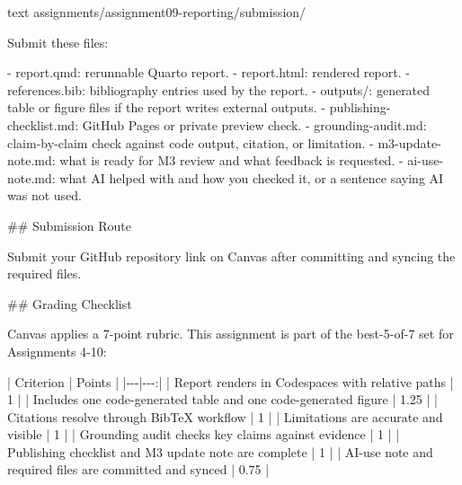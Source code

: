 \documentclass[
  letterpaper,
  DIV=11,
  numbers=noendperiod,
  oneside]{scrreprt}
\newenvironment{Shaded}{\begin{snugshade}}{\end{snugshade}}
\newcommand{\FunctionTok}[1]{\textcolor[rgb]{0.28,0.35,0.67}{#1}}
\newcommand{\InformationTok}[1]{\textcolor[rgb]{0.37,0.37,0.37}{#1}}
\newcommand{\NormalTok}[1]{\textcolor[rgb]{0.00,0.23,0.31}{#1}}
\newcommand{\PreprocessorTok}[1]{\textcolor[rgb]{0.68,0.00,0.00}{#1}}
\newcommand{\SpecialStringTok}[1]{\textcolor[rgb]{0.13,0.47,0.30}{#1}}
\begin{document}
\begin{Shaded}
\begin{Highlighting}[numbers=left,,]
\InformationTok{\textasciigrave{}\textasciigrave{}\textasciigrave{}text}
\InformationTok{assignments/assignment09{-}reporting/submission/}
\InformationTok{\textasciigrave{}\textasciigrave{}\textasciigrave{}}

\NormalTok{Submit these files:}

\SpecialStringTok{{-} }\InformationTok{\textasciigrave{}report.qmd\textasciigrave{}}\NormalTok{: rerunnable Quarto report.}
\SpecialStringTok{{-} }\InformationTok{\textasciigrave{}report.html\textasciigrave{}}\NormalTok{: rendered report.}
\SpecialStringTok{{-} }\InformationTok{\textasciigrave{}references.bib\textasciigrave{}}\NormalTok{: bibliography entries used by the report.}
\SpecialStringTok{{-} }\InformationTok{\textasciigrave{}outputs/\textasciigrave{}}\NormalTok{: generated table or figure files if the report writes external outputs.}
\SpecialStringTok{{-} }\InformationTok{\textasciigrave{}publishing{-}checklist.md\textasciigrave{}}\NormalTok{: GitHub Pages or private preview check.}
\SpecialStringTok{{-} }\InformationTok{\textasciigrave{}grounding{-}audit.md\textasciigrave{}}\NormalTok{: claim{-}by{-}claim check against code output, citation, or limitation.}
\SpecialStringTok{{-} }\InformationTok{\textasciigrave{}m3{-}update{-}note.md\textasciigrave{}}\NormalTok{: what is ready for M3 review and what feedback is requested.}
\SpecialStringTok{{-} }\InformationTok{\textasciigrave{}ai{-}use{-}note.md\textasciigrave{}}\NormalTok{: what AI helped with and how you checked it, or a sentence saying AI was not used.}

\FunctionTok{\#\# Submission Route}

\NormalTok{Submit your GitHub repository link on Canvas after committing and syncing the required files.}

\FunctionTok{\#\# Grading Checklist}

\NormalTok{Canvas applies a 7{-}point rubric. This assignment is part of the best{-}5{-}of{-}7 set for Assignments 4{-}10:}

\PreprocessorTok{|}\NormalTok{ Criterion }\PreprocessorTok{|}\NormalTok{ Points }\PreprocessorTok{|}
\PreprocessorTok{|{-}{-}{-}|{-}{-}{-}:|}
\PreprocessorTok{|}\NormalTok{ Report renders in Codespaces with relative paths }\PreprocessorTok{|}\NormalTok{ 1 }\PreprocessorTok{|}
\PreprocessorTok{|}\NormalTok{ Includes one code{-}generated table and one code{-}generated figure }\PreprocessorTok{|}\NormalTok{ 1.25 }\PreprocessorTok{|}
\PreprocessorTok{|}\NormalTok{ Citations resolve through BibTeX workflow }\PreprocessorTok{|}\NormalTok{ 1 }\PreprocessorTok{|}
\PreprocessorTok{|}\NormalTok{ Limitations are accurate and visible }\PreprocessorTok{|}\NormalTok{ 1 }\PreprocessorTok{|}
\PreprocessorTok{|}\NormalTok{ Grounding audit checks key claims against evidence }\PreprocessorTok{|}\NormalTok{ 1 }\PreprocessorTok{|}
\PreprocessorTok{|}\NormalTok{ Publishing checklist and M3 update note are complete }\PreprocessorTok{|}\NormalTok{ 1 }\PreprocessorTok{|}
\PreprocessorTok{|}\NormalTok{ AI{-}use note and required files are committed and synced }\PreprocessorTok{|}\NormalTok{ 0.75 }\PreprocessorTok{|}


\end{Highlighting}
\end{Shaded}
\end{document}
